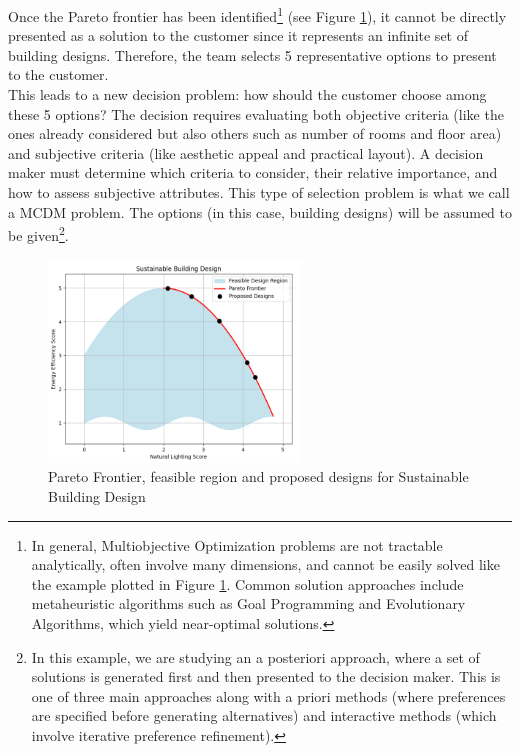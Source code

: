 Once the Pareto frontier has been identified\footnote{In general, Multiobjective Optimization problems are not tractable analytically, often involve many dimensions, and cannot be easily solved like the example plotted in Figure \ref{fig:pareto_frontier}. Common solution approaches include metaheuristic algorithms such as Goal Programming and Evolutionary Algorithms, which yield near-optimal solutions.}
(see Figure \ref{fig:pareto_frontier}), it cannot be directly presented as a solution to the customer since it represents an infinite set of building designs. Therefore, the team selects 5 representative options to present to the customer. \\

This leads to a new decision problem: how should the customer choose among these 5 options? The decision requires evaluating both objective criteria (like the ones already considered but also others such as number of rooms and floor area) and subjective criteria (like aesthetic appeal and practical layout). A decision maker must determine which criteria to consider, their relative importance, and how to assess subjective attributes. This type of selection problem is what we call a MCDM problem. The options (in this case, building designs) will be assumed to be given\footnote{
In this example, we are studying an a posteriori approach, where a set of solutions is generated first and then presented to the decision maker. This is one of three main approaches along with a priori methods (where preferences are specified before generating alternatives) and interactive methods (which involve iterative preference refinement).}.

\begin{figure}[ht]
    \centering
    \includegraphics[width=0.6\textwidth]{ch2/figures/pareto.png}
    \caption{Pareto Frontier, feasible region and proposed designs for Sustainable Building Design}
    \label{fig:pareto_frontier}
\end{figure}

